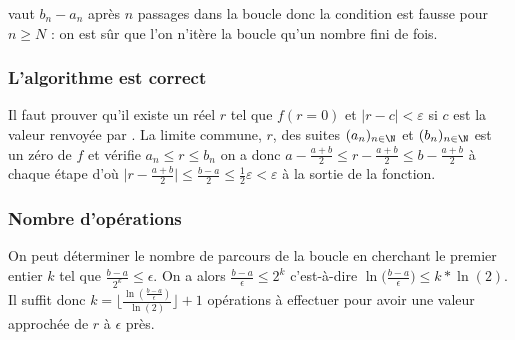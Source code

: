    vaut $b_n - a_n$ après $n$ passages dans la boucle donc la condition  est fausse pour $n\ge N$ : on est sûr que l'on n'itère la boucle qu'un nombre fini de fois. 
\subsubsection{L'algorithme est correct}
Il faut prouver qu'il existe un réel $r$ tel que $f(r=0)$ et $|r-c| < \varepsilon$ si $c$ est la valeur renvoyée par . 
La limite commune, $r$,  des suites $(a_n)_{n\in \N}$ et $(b_n)_{n\in \N}$  est un zéro de $f$ et vérifie $a_n\le r \le b_n$ on a donc  $\displaystyle a-\frac{a+b}2 \le r - \frac{a+b}2 \le b - \frac{a+b}2$ à chaque étape d'où $\displaystyle \bigl|r-\frac{a+b}2\bigr|\le \frac{b-a}2\le \frac 12\varepsilon < \varepsilon$ à la sortie de la fonction. 
\subsubsection{Nombre d'opérations}
On peut déterminer le nombre de parcours de la boucle en cherchant le premier entier $k$ tel que $\displaystyle \frac{b-a}{2^k} \le \epsilon $. 
On a alors $\displaystyle \frac{b-a}{\epsilon} \le 2^k$ c'est-à-dire $\displaystyle \ln\bigl(\frac{b-a}{\epsilon}\bigr) \le k*\ln(2)$.
Il suffit donc  $\displaystyle k= \bigl\lfloor \frac{\ln(\frac{b-a}{\epsilon})}{\ln(2)}\bigr\rfloor + 1 $ opérations à effectuer pour avoir une valeur approchée de $r$ à $\epsilon$ près.

\newpage
